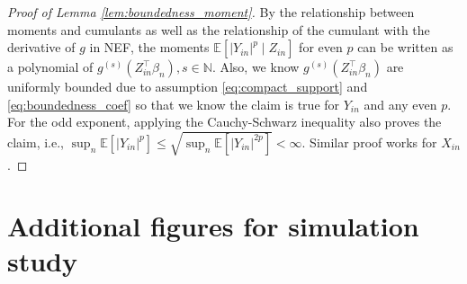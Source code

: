 \documentclass[12pt]{article}
\theoremstyle{definition}
\newcommand{\E}{\mathbb E}								%
\newcommand{\srx}{X}									%
\newcommand{\srz}{Z}									%
\newcommand{\sry}{Y}									%
\begin{document}
\begin{proof}[Proof of Lemma \ref{lem:boundedness_moment}]
  By the relationship between moments and cumulants as well as the relationship of the cumulant with the derivative of $g$ in NEF, the moments $\E[|\sry_{in}|^p\mid \srz_{in}]$ for even $p$ can be written as a polynomial of $g^{(s)}(\srz_{in}^\top\beta_n),s\in\mathbb{N}$. Also, we know $g^{(s)}(\srz_{in}^\top\beta_n)$ are uniformly bounded due to assumption \eqref{eq:compact_support} and \eqref{eq:boundedness_coef} so that we know the claim is true for $\sry_{in}$ and any even $p$. For the odd exponent, applying the Cauchy-Schwarz inequality also proves the claim, i.e., $\sup_n\E[|\sry_{in}|^p]\leq \sqrt{\sup_n\E[|\sry_{in}|^{2p}]}<\infty$. Similar proof works for $\srx_{in}$.
\end{proof}





\section{Additional figures for simulation study}\label{sec:additional_figure_simulation}
\end{document}
